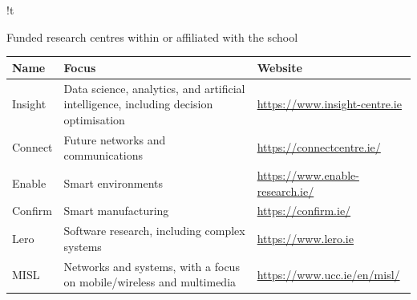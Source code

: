 \begin{tabbox}{!t}

\caption{Funded research centres within or affiliated with the school}
\label{tab:researchcentres}
\footnotesize 


\begin{tabular}{p{2.5cm}
                p{7.5cm}
                !{\qquad}
                p{4cm}
                }
\toprule 
Name & Focus & Website\\ 

\midrule 

Insight&
Data science, analytics, and artificial intelligence, including decision optimisation & \url{https://www.insight-centre.ie}\\
\hdashline
Connect&
Future networks and communications & \url{https://connectcentre.ie/}\\
\hdashline
Enable&
Smart environments & \url{https://www.enable-research.ie/}\\
\hdashline
Confirm&
Smart manufacturing & \url{https://confirm.ie/} \\
\hdashline
Lero&
Software research, including complex
systems & \url{https://www.lero.ie}\\
\hdashline
MISL&
Networks and systems, with a focus on mobile/wireless and multimedia & \url{https://www.ucc.ie/en/misl/}\\

\bottomrule 
\end{tabular}

\end{tabbox}

